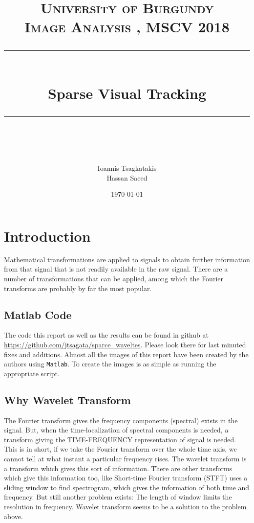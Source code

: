 \documentclass[a4paper,12pt]{article}
\title{
\normalfont \normalsize 
\textsc{University of Burgundy \\ 
Image Analysis
, MSCV 2018} \\
[10pt] 
\rule{\linewidth}{0.5pt} \\[6pt] 
\huge Sparse Visual Tracking \\
\rule{\linewidth}{2pt}  \\[10pt]
}
\author{Ioannis Tsagkatakis \\ Hassan Saeed}
\date{\normalsize \today}
\begin{document}
\maketitle
\noindent


\section{Introduction}
Mathematical transformations are applied to signals to obtain further information from that signal that is not readily available in the raw signal. There are a number of transformations that can be applied, among which the Fourier transforms are probably by far the most popular.


\subsection*{Matlab Code}
The code this report as well as the results can be found in  github at \url{https://github.com/jtsagata/sparce_waveltes}. Please look there for last minuted fixes and additions. Almost all the images of this report have been created by the authors using \texttt{Matlab}. To create the images is as simple as running the appropriate script.  

\subsection{Why Wavelet Transform }
The Fourier transform gives the frequency components (spectral) exists in the signal. But, when the time-localization of spectral components is needed, a transform giving the TIME-FREQUENCY representation of signal is needed. This is in short, if we take the Fourier transform over the whole time axis, we cannot tell at what instant a particular frequency rises. The wavelet transform is a transform which gives this sort of information. There are other transforms which give this information too, like Short-time Fourier transform (STFT) uses a sliding window to find spectrogram, which gives the information of both time and frequency. But still another problem exists: The length of window limits the resolution in frequency. Wavelet transform seems to be a solution to the problem above.
\end{document}
